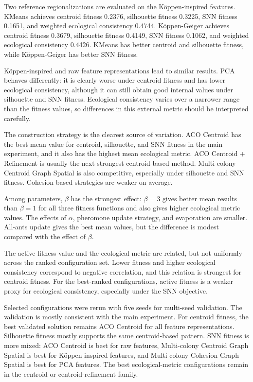 \documentclass[11pt]{article}
\begin{document}
Two reference regionalizations are evaluated on the Köppen-inspired features. KMeans achieves centroid fitness 0.2376, silhouette fitness 0.3225, SNN fitness 0.1651, and weighted ecological consistency 0.4744. Köppen-Geiger achieves centroid fitness 0.3679, silhouette fitness 0.4149, SNN fitness 0.1062, and weighted ecological consistency 0.4426. KMeans has better centroid and silhouette fitness, while Köppen-Geiger has better SNN fitness.

Köppen-inspired and raw feature representations lead to similar results. PCA behaves differently: it is clearly worse under centroid fitness and has lower ecological consistency, although it can still obtain good internal values under silhouette and SNN fitness. Ecological consistency varies over a narrower range than the fitness values, so differences in this external metric should be interpreted carefully.

The construction strategy is the clearest source of variation. ACO Centroid has the best mean value for centroid, silhouette, and SNN fitness in the main experiment, and it also has the highest mean ecological metric. ACO Centroid + Refinement is usually the next strongest centroid-based method. Multi-colony Centroid Graph Spatial is also competitive, especially under silhouette and SNN fitness. Cohesion-based strategies are weaker on average.

Among parameters, $\beta$ has the strongest effect: $\beta=3$ gives better mean results than $\beta=1$ for all three fitness functions and also gives higher ecological metric values. The effects of $\alpha$, pheromone update strategy, and evaporation are smaller. All-ants update gives the best mean values, but the difference is modest compared with the effect of $\beta$.

The active fitness value and the ecological metric are related, but not uniformly across the ranked configuration set. Lower fitness and higher ecological consistency correspond to negative correlation, and this relation is strongest for centroid fitness. For the best-ranked configurations, active fitness is a weaker proxy for ecological consistency, especially under the SNN objective.

Selected configurations were rerun with five seeds for multi-seed validation. The validation is mostly consistent with the main experiment. For centroid fitness, the best validated solution remains ACO Centroid for all feature representations. Silhouette fitness mostly supports the same centroid-based pattern. SNN fitness is more mixed: ACO Centroid is best for raw features, Multi-colony Centroid Graph Spatial is best for Köppen-inspired features, and Multi-colony Cohesion Graph Spatial is best for PCA features. The best ecological-metric configurations remain in the centroid or centroid-refinement family.
\end{document}
